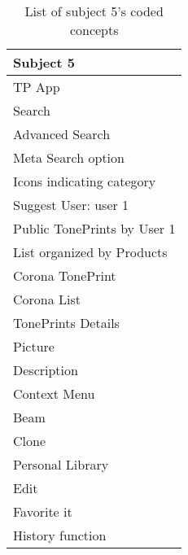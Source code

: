 \begin{table}[H]
\begin{minipage}[b]{0.49\linewidth}
	\begin{tabular}{|l|}
    \hline
    Subject 5 \\ \hline
    TP App \\
   	Search  \\
    Advanced Search  \\
    Meta Search option  \\
    Icons indicating category  \\
    Suggest User: user 1  \\
    Public TonePrints by User 1  \\
    List organized by Products  \\
    Corona TonePrint \\
    Corona List \\
    TonePrints Details \\
    Picture \\
    Description \\
    Context Menu \\
    Beam \\
    Clone \\
    Personal Library \\
    Edit \\
    Favorite it \\
    History function  \\ \hline
    \end{tabular}
	\caption{List of subject 5's coded concepts}
    \label{tab:Subject5Coded}
        
\end{minipage}
\end{table}














